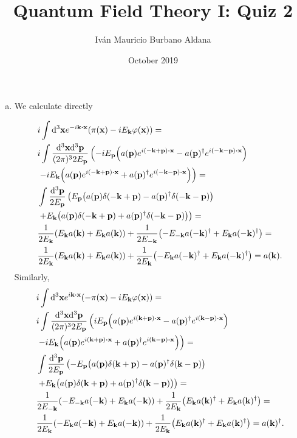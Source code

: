 \documentclass{article}
\title{Quantum Field Theory I: Quiz 2}
\author{Iván Mauricio Burbano Aldana}
\date{October 2019}
\begin{document}
\maketitle

\begin{enumerate}[a)]

\item We calculate directly

\begin{equation}
\begin{aligned}
&i\int\dd[3]\vb{x}e^{-i\vb{k}\vdot\vb{x}}\qty(\pi(\vb{x})-iE_{\vb{k}}\varphi(\vb{x}))=\\
&i\int\frac{\dd[3]\vb{x}\dd[3]\vb{p}}{(2\pi)^32E_{\vb{p}}}\left(-iE_{\vb{p}}\qty(a(\vb{p})e^{i(-\vb{k}+\vb{p})\vdot\vb{x}}-a(\vb{p})^\dagger e^{i(-\vb{k}-\vb{p})\vdot\vb{x}})\right.\\
&\left.-iE_{\vb{k}}\qty(a(\vb{p})e^{i(-\vb{k}+\vb{p})\vdot\vb{x}}+a(\vb{p})^\dagger e^{i(-\vb{k}-\vb{p})\vdot\vb{x}})\right)=\\
&\int\frac{\dd[3]{\vb{p}}}{2E_{\vb{p}}}\left(E_{\vb{p}}\qty(a(\vb{p})\delta(-\vb{k}+\vb{p})-a(\vb{p})^\dagger \delta(-\vb{k}-\vb{p}))\right.\\
&\left.+E_{\vb{k}}\qty(a(\vb{p})\delta(-\vb{k}+\vb{p})+a(\vb{p})^\dagger \delta(-\vb{k}-\vb{p}))\right)=\\
&\frac{1}{2E_{\vb{k}}}\qty(E_{\vb{k}}a(\vb{k})+E_{\vb{k}}a(\vb{k}))+\frac{1}{2E_{-\vb{k}}}\qty(-E_{-\vb{k}}a(-\vb{k})^\dagger+E_{\vb{k}}a(-\vb{k})^\dagger)=\\
&\frac{1}{2E_{\vb{k}}}\qty(E_{\vb{k}}a(\vb{k})+E_{\vb{k}}a(\vb{k}))+\frac{1}{2E_{\vb{k}}}\qty(-E_{\vb{k}}a(-\vb{k})^\dagger+E_{\vb{k}}a(-\vb{k})^\dagger)=a(\vb{k}).
\end{aligned}
\end{equation}
Similarly,
\begin{equation}
\begin{aligned}
&i\int\dd[3]\vb{x}e^{i\vb{k}\vdot\vb{x}}\qty(-\pi(\vb{x})-iE_{\vb{k}}\varphi(\vb{x}))=\\
&i\int\frac{\dd[3]\vb{x}\dd[3]\vb{p}}{(2\pi)^32E_{\vb{p}}}\left(iE_{\vb{p}}\qty(a(\vb{p})e^{i(\vb{k}+\vb{p})\vdot\vb{x}}-a(\vb{p})^\dagger e^{i(\vb{k}-\vb{p})\vdot\vb{x}})\right.\\
&\left.-iE_{\vb{k}}\qty(a(\vb{p})e^{i(\vb{k}+\vb{p})\vdot\vb{x}}+a(\vb{p})^\dagger e^{i(\vb{k}-\vb{p})\vdot\vb{x}})\right)=\\
&\int\frac{\dd[3]{\vb{p}}}{2E_{\vb{p}}}\left(-E_{\vb{p}}\qty(a(\vb{p})\delta(\vb{k}+\vb{p})-a(\vb{p})^\dagger \delta(\vb{k}-\vb{p}))\right.\\
&\left.+E_{\vb{k}}\qty(a(\vb{p})\delta(\vb{k}+\vb{p})+a(\vb{p})^\dagger \delta(\vb{k}-\vb{p}))\right)=\\
&\frac{1}{2E_{-\vb{k}}}\qty(-E_{-\vb{k}}a(-\vb{k})+E_{\vb{k}}a(-\vb{k}))+\frac{1}{2E_{\vb{k}}}\qty(E_{\vb{k}}a(\vb{k})^\dagger+E_{\vb{k}}a(\vb{k})^\dagger)=\\
&\frac{1}{2E_{\vb{k}}}\qty(-E_{\vb{k}}a(-\vb{k})+E_{\vb{k}}a(-\vb{k}))+\frac{1}{2E_{\vb{k}}}\qty(E_{\vb{k}}a(\vb{k})^\dagger+E_{\vb{k}}a(\vb{k})^\dagger)=a(\vb{k})^\dagger.
\end{aligned}
\end{equation}


\end{enumerate}
\end{document}
